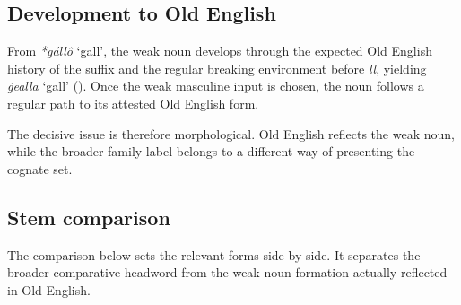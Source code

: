 \documentclass[
  british,
  a4paper,
  openany]{book}
\providecommand{\Recon}[1]{\emph{*#1}}
{\catcode`→=\active \global\def→{\ensuremath{\rightarrow}}}
\providecommand{\Recon}[1]{\emph{*#1}}
{\catcode`→=\active \global\def→{\ensuremath{\rightarrow}}}
\begin{document}
\subsection{Development to Old
English}\label{development-to-old-english-82}

From {\Recon{gállô} `gall'}, the weak noun develops through the expected
Old English history of the suffix and the regular breaking environment
before \emph{ll}, yielding {\emph{ġealla}} `gall'
(). Once the weak
masculine input is chosen, the noun follows a regular path to its
attested Old English form.

The decisive issue is therefore morphological. Old English reflects the
weak noun, while the broader family label belongs to a different way of
presenting the cognate set.

\subsection{Stem comparison}\label{stem-comparison}

The comparison below sets the relevant forms side by side. It separates
the broader comparative headword from the weak noun formation actually
reflected in Old English.
\end{document}
